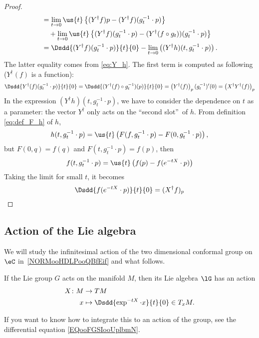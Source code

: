\begin{proof}
\begin{equation}
\begin{aligned}
			 & =\lim_{t\to 0}\us{t}\left\{ (Y^{\dag} f)p-(Y^{\dag} f)(g_t^{-1}\cdot p) \right\} \\
			 & \quad+\lim_{t\to 0}\us{t}\left\{ (Y^{\dag} f)(g_t^{-1}\cdot p)
			-(Y^{\dag}(f\circ g_t) )(g_t^{-1}\cdot p)
			\right\}                                                                            \\
			 & =\Dsdd{ (Y^{\dag} f)(g_t^{-1}\cdot p) }{t}{0}-\lim_{t\to 0}
			\left(    (Y^{\dag} h)(t,g_t^{-1}\cdot p)       \right).
		\end{aligned}
	\end{equation}
	The latter equality comes from  \eqref{eq:Y_h}. The first term is computed as following ($Y^{\dag}(f)$ is a function):
	\begin{equation}
		\Dsdd{ Y^{\dag}(f)(g_t^{-1}\cdot p) }{t}{0}=\Dsdd{ (Y^{\dag}(f)\circ g_t^{-1})(p) }{t}{0}
		=\left( Y^{\dag}(f) \right)_p(g_t^{-1})'(0)
		=\left( X^{\dag} Y^{\dag}(f)\right)_p
	\end{equation}
	In the expression $(Y^{\dag} h)(t,g_t^{-1}\cdot p)$, we have to consider the dependence on $t$ as a parameter: the vector $Y^{\dag}$ only acts on the ``second slot''\ of $h$. From definition \eqref{eq:def_F_h} of $h$,
	\[
		h(t,g_t^{-1}\cdot p)=\us{t}\left(  F(f,g_t^{-1}\cdot p)-F(0,g_t^{-1}\cdot p)
		\right),
	\]
	but $F(0,q)=f(q)$ and $F(t,g_t^{-1}\cdot p)=f(p)$, then
	\[
		f(t,g_t^{-1}\cdot p)=\us{t}\left( f(p)-f(e^{-tX}\cdot p) \right)
	\]
	Taking the limit for small $t$, it becomes
	\[
		\Dsdd{f(e^{-tX}\cdot p)}{t}{0}=(X^{\dag} f)_p
	\]

\end{proof}

\subsection{Action of the Lie algebra}

\begin{normaltext}
	We will study the infinitesimal action of the two dimensional conformal group on $\eC$ in~\ref{NORMooHDLPooQBfEif} and what follows.
\end{normaltext}

\begin{definition}       \label{DEFooUYOZooWdcClz}
	If the Lie group \( G\) acts on the manifold \( M\), then its Lie algebra \( \lG\) has an action
	\begin{equation}
		\begin{aligned}
			X\colon M & \to TM                                             \\
			x         & \mapsto \Dsdd{  \exp^{-tX}\cdot x }{t}{0}\in T_xM.
		\end{aligned}
	\end{equation}
\end{definition}
If you want to know how to integrate this to an action of the group, see the differential equation \eqref{EQooFGSIooUplbmN}.

